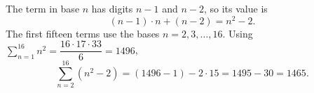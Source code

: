 The term in base $n$ has digits $n-1$ and $n-2$, so its value is
\[
(n-1)\cdot n+(n-2)=n^2-2 .
\]
The first fifteen terms use the bases $n=2,3,\dots,16$. Using $\sum_{n=1}^{16}n^2=\dfrac{16\cdot17\cdot33}{6}=1496$,
\[
\sum_{n=2}^{16}(n^2-2)=(1496-1)-2\cdot15=1495-30=\boxed{1465}.
\]
